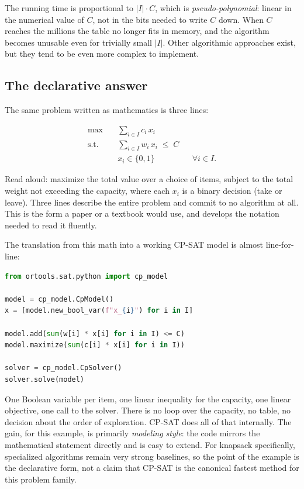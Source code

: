 The running time is proportional to \(\lvert I \rvert \cdot C\), which
is \emph{pseudo-polynomial}: linear in the numerical value of \(C\),
not in the bits needed to write \(C\) down. When \(C\) reaches the
millions the table no longer fits in memory, and the algorithm becomes
unusable even for trivially small \(\lvert I \rvert\). Other
algorithmic approaches exist, but they tend to be even more complex to
implement.

\subsection{The declarative answer}\label{sec:1.1.2}

The same problem written as mathematics is three lines:

\[
\begin{aligned}
\max \quad      & \sum_{i \in I} c_i\, x_i \\
\text{s.t.} \quad   & \sum_{i \in I} w_i\, x_i \;\le\; C \\
                    & x_i \in \{0, 1\} && \forall i \in I.
\end{aligned}
\]

Read aloud: maximize the total value over a choice of items, subject to
the total weight not exceeding the capacity, where each \(x_i\) is a
binary decision (take or leave). Three lines describe the entire problem
and commit to no algorithm at all. This is the form a paper or a
textbook would use, and  develops the notation needed to
read it fluently.

The translation from this math into a working CP-SAT model is almost
line-for-line:

\begin{lstlisting}[language=Python]
from ortools.sat.python import cp_model

model = cp_model.CpModel()
x = [model.new_bool_var(f"x_{i}") for i in I]

model.add(sum(w[i] * x[i] for i in I) <= C)
model.maximize(sum(c[i] * x[i] for i in I))

solver = cp_model.CpSolver()
solver.solve(model)
\end{lstlisting}

One Boolean variable per item, one linear inequality for the capacity,
one linear objective, one call to the solver. There is no loop over the
capacity, no table, no decision about the order of exploration. CP-SAT
does all of that internally. The gain, for this example, is primarily
\emph{modeling style}: the code mirrors the mathematical statement
directly and is easy to extend. For knapsack specifically, specialized
algorithms remain very strong baselines, so the point of the example is
the declarative form, not a claim that CP-SAT is the canonical fastest
method for this problem family.

